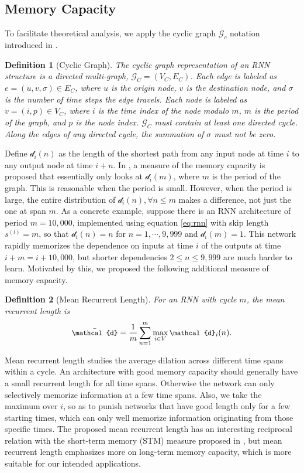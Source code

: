 \documentclass{article}
\newtheorem{definition}{Definition}[section]
\begin{document}
\subsection{Memory Capacity}
\label{subsec:mem_cap}
To facilitate theoretical analysis, we apply the cyclic graph $\mathcal{G}_c$ notation introduced in \cite{zhang2016architectural}.

\begin{definition}[Cyclic Graph]
The cyclic graph representation of an RNN structure is a directed multi-graph, $\mathcal{G}_C = (V_C, E_C)$. Each edge is labeled as $e = (u, v, \sigma)\in E_C$, where $u$ is the origin node, $v$ is the destination node, and $\sigma$ is the number of time steps the edge travels. Each node is labeled as $v = (i, p) \in V_C$, where $i$ is the time index of the node modulo $m$, $m$ is the period of the graph, and $p$ is the node index. $\mathcal{G}_C$ must contain at least one directed cycle. Along the edges of any directed cycle, the summation of $\sigma$ must not be zero.
\end{definition}

Define $\mathcal{d}_i(n)$ as the length of the shortest path from any input node at time $i$ to any output node at time $i+n$. In \cite{zhang2016architectural}, a measure of the memory capacity is proposed that essentially only looks at $\mathcal{d}_i(m)$, where $m$ is the period of the graph. This is reasonable when the period is small. However, when the period is large, the entire distribution of $\mathcal{d}_i (n), \forall n \leq m$ makes a difference, not just the one at span $m$.  As a concrete example, suppose there is an RNN architecture of period $m = 10,000$, implemented using equation \eqref{eq:rnn} with skip length $s^{(l)}=m$, so that $\mathcal{d}_i(n) = n$ for $n = 1, \cdots, 9,999$ and $\mathcal{d}_i(m) = 1$. This network rapidly memorizes the dependence on inputs at time $i$ of the outputs at time $i+m=i+10,000$, but shorter dependencies $2\le n\le 9,999$ are much harder to learn.  Motivated by this, we proposed the following additional measure of memory capacity.
\begin{definition}[Mean Recurrent Length]
  For an RNN with cycle $m$, the mean recurrent length is
\begin{equation}
\small
\bar{\mathcal{d}} = \frac{1}{m} \sum_{n=1}^m \max_{i \in V} \mathcal{d}_i(n).
\label{eq:recur_len}
\end{equation}
\end{definition}
Mean recurrent length studies the average dilation across different time spans within a cycle. An architecture with good memory capacity should generally have a small recurrent length for all time spans. Otherwise the network can only selectively memorize information at a few time spans. Also, we take the maximum over $i$, so as to punish networks that have good length only for a few starting times, which can only well memorize information originating from those specific times.  The proposed mean recurrent length has an interesting reciprocal relation with the short-term memory (STM) measure proposed in \cite{jaeger2001short}, but mean recurrent length emphasizes more on long-term memory capacity, which is more suitable for our intended applications.
\end{document}
